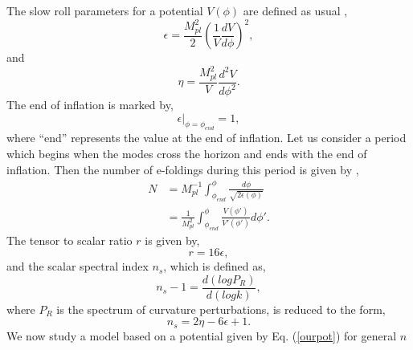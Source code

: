 \documentclass[prd,twocolumn,superscriptaddress]{revtex4}
\begin{document}
The slow roll parameters for a potential $V(\phi)$ are defined as usual \cite{QIPlanck2015SamiWali,LythontheHilltop},
\begin{equation}
\epsilon = \frac{M_{pl}^2}{2} {\left( \frac{1}{V} \frac{d V}{d \phi} \right)}^2 \label{epsilon},
\end{equation}
and
\begin{equation}
\eta = \frac{M_{pl}^2}{V} \frac{d^2 V}{d {\phi}^2} \label{eta}.
\end{equation}
The end of inflation is marked by,
\begin{equation}
\epsilon |_{\phi = \phi_{end}} = 1 \label{end} ,
\end{equation}
where ``end'' represents the value at the end of inflation.
Let us consider a period which begins when the modes cross the horizon and ends with the end of inflation. Then the number of e-foldings
during this period is given by \cite{QIPlanck2015SamiWali,LythontheHilltop},
\begin{align}
N &= M_{pl}^{-1} \int_{\phi_{end}}^{\phi}{\frac{d \phi}{\sqrt{2 \epsilon(\phi)}}} \\
&= \frac{1}{M_{pl}^2} \int_{\phi_{end}}^{\phi}{\frac{V(\phi')}{V'(\phi')}d \phi'} \label{efoldings}  .
\end{align}
The tensor to scalar ratio $r$ is given by,
\begin{equation}
r = 16 \epsilon \label{ttsr},
\end{equation}
and the scalar spectral index $n_s$, which is defined as,
\begin{equation}
n_s - 1 = \frac{d(log P_R)}{d(log k)},
\end{equation}
where $P_R$ is the spectrum of curvature perturbations, is reduced to the form,
\begin{equation}
n_s = 2 \eta - 6 \epsilon + 1 \label{spectralindex}.
\end{equation}
We now study a model based on a potential given by Eq. (\ref{ourpot}) for general $n$
\end{document}
